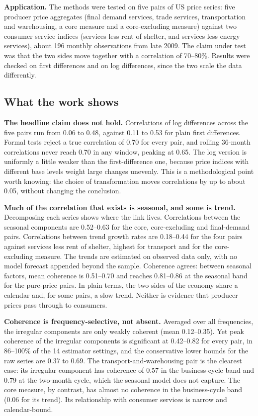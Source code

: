 \documentclass[
  british,
  a4paper,
]{article}
\begin{document}
\textbf{Application.} The methods were tested on five pairs of US price
series: five producer price aggregates (final demand services, trade
services, transportation and warehousing, a core measure and a
core-excluding measure) against two consumer service indices (services
less rent of shelter, and services less energy services), about 196
monthly observations from late 2009. The claim under test was that the
two sides move together with a correlation of 70--80\%. Results were
checked on first differences and on log differences, since the two scale
the data differently.

\subsection{What the work shows}\label{what-the-work-shows}

\textbf{The headline claim does not hold.} Correlations of log
differences across the five pairs run from 0.06 to 0.48, against 0.11 to
0.53 for plain first differences. Formal tests reject a true correlation
of 0.70 for every pair, and rolling 36-month correlations never reach
0.70 in any window, peaking at 0.65. The log version is uniformly a
little weaker than the first-difference one, because price indices with
different base levels weight large changes unevenly. This is a
methodological point worth knowing: the choice of transformation moves
correlations by up to about 0.05, without changing the conclusion.

\textbf{Much of the correlation that exists is seasonal, and some is
trend.} Decomposing each series shows where the link lives. Correlations
between the seasonal components are 0.52--0.63 for the core,
core-excluding and final-demand pairs. Correlations between trend growth
rates are 0.18--0.44 for the four pairs against services less rent of
shelter, highest for transport and for the core-excluding measure. The
trends are estimated on observed data only, with no model forecast
appended beyond the sample. Coherence agrees: between seasonal factors,
mean coherence is 0.51--0.70 and reaches 0.81--0.86 at the seasonal band
for the pure-price pairs. In plain terms, the two sides of the economy
share a calendar and, for some pairs, a slow trend. Neither is evidence
that producer prices pass through to consumers.

\textbf{Coherence is frequency-selective, not absent.} Averaged over all
frequencies, the irregular components are only weakly coherent (mean
0.12--0.35). Yet peak coherence of the irregular components is
significant at 0.42--0.82 for every pair, in 86--100\% of the 14
estimator settings, and the conservative lower bounds for the raw series
are 0.37 to 0.69. The transport-and-warehousing pair is the clearest
case: its irregular component has coherence of 0.57 in the
business-cycle band and 0.79 at the two-month cycle, which the seasonal
model does not capture. The core measure, by contrast, has almost no
coherence in the business-cycle band (0.06 for its trend). Its
relationship with consumer services is narrow and calendar-bound.
\end{document}
